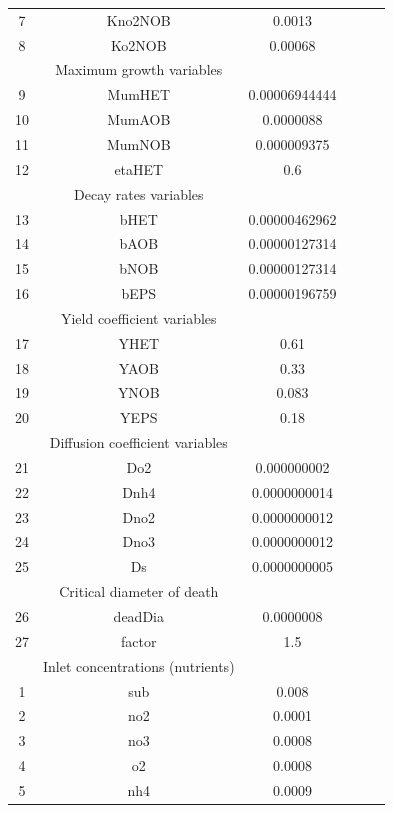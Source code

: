 \begin{acknowledgements}
\begin{table}[!ht]
{\begin{tabular}{*{2}{c|c|c}}
7&Kno2NOB & 0.0013\\
8&Ko2NOB & 0.00068\\
\hline
&Maximum growth variables\\
\hline
9&MumHET & 0.00006944444\\
10&MumAOB & 0.0000088\\
11&MumNOB & 0.000009375\\
12&etaHET & 0.6\\
\hline
&Decay rates variables\\
\hline 
13& bHET & 0.00000462962\\
14&bAOB & 0.00000127314\\
15&bNOB & 0.00000127314\\
16&bEPS & 0.00000196759\\
\hline
&Yield coefficient variables\\
\hline 
17&YHET & 0.61\\
18&YAOB & 0.33\\
19&YNOB & 0.083\\
20&YEPS & 0.18\\
\hline
&Diffusion coefficient variables\\
\hline 
21&Do2 & 0.000000002\\
22&Dnh4 & 0.0000000014\\
23&Dno2 & 0.0000000012\\
24&Dno3 & 0.0000000012\\
25&Ds & 0.0000000005\\
\hline
&Critical diameter of death\\
\hline 
26&deadDia & 0.0000008\\
27&factor &1.5\\
\hline
&Inlet concentrations (nutrients)\\
\hline \hline
1&sub &0.008 \\
2&no2 & 0.0001\\
3&no3 & 0.0008\\
4&o2 & 0.0008\\
5&nh4 &0.0009\\

\end{tabular}}
\end{table}



\end{acknowledgements}
